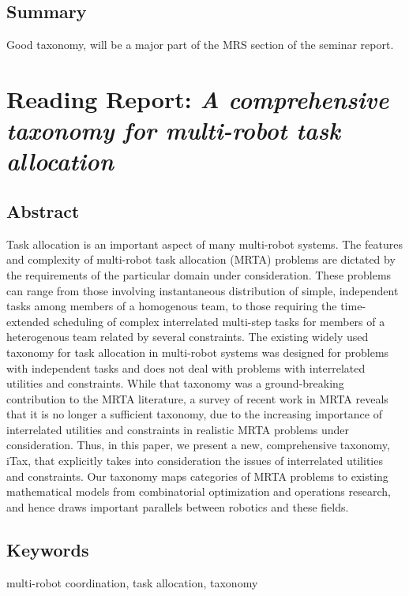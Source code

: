     \subsection*{Summary}
    Good taxonomy, will be a major part of the MRS section of the seminar report.
 
    
    \newpage

    \section{Reading Report: \emph{A comprehensive taxonomy for multi-robot task allocation}}
    \label{sec:Korsah2013}
    \cite{Korsah2013}
    
    \subsection*{Abstract}
    Task allocation is an important aspect of many multi-robot systems. The features and complexity of multi-robot task allocation (MRTA) problems are dictated by the requirements of the particular domain under consideration. These problems
    can range from those involving instantaneous distribution of simple, independent tasks among members of a homogenous
    team, to those requiring the time-extended scheduling of complex interrelated multi-step tasks for members of a heterogenous team related by several constraints. The existing widely used taxonomy for task allocation in multi-robot systems was
    designed for problems with independent tasks and does not deal with problems with interrelated utilities and constraints.
    While that taxonomy was a ground-breaking contribution to the MRTA literature, a survey of recent work in MRTA reveals
    that it is no longer a sufficient taxonomy, due to the increasing importance of interrelated utilities and constraints in
    realistic MRTA problems under consideration. Thus, in this paper, we present a new, comprehensive taxonomy, iTax, that
    explicitly takes into consideration the issues of interrelated utilities and constraints. Our taxonomy maps categories of
    MRTA problems to existing mathematical models from combinatorial optimization and operations research, and hence
    draws important parallels between robotics and these fields.
    
    \subsection*{Keywords}
    multi-robot coordination, task allocation, taxonomy
    

